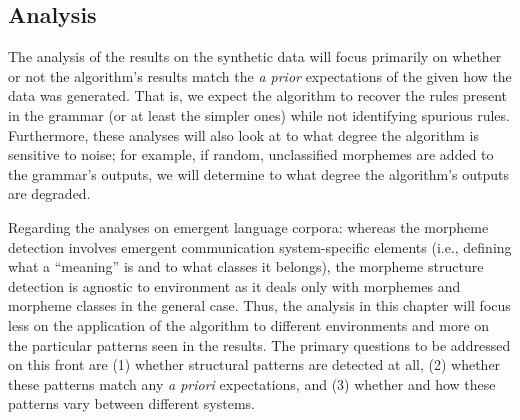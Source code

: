 \subsection{Analysis}

The analysis of the results on the synthetic data will focus primarily on whether or not the algorithm's results match the \emph{a prior} expectations of the given how the data was generated.
That is, we expect the algorithm to recover the rules present in the grammar (or at least the simpler ones) while not identifying spurious rules.
Furthermore, these analyses will also look at to what degree the algorithm is sensitive to noise; for example, if random, unclassified morphemes are added to the grammar's outputs, we will determine to what degree the algorithm's outputs are degraded.

Regarding the analyses on emergent language corpora:
  whereas the morpheme detection involves emergent communication system-specific elements (i.e., defining what a ``meaning'' is and to what classes it belongs), the morpheme structure detection is agnostic to environment as it deals only with morphemes and morpheme classes in the general case.
Thus, the analysis in this chapter will focus less on the application of the algorithm to different environments and more on the particular patterns seen in the results.
The primary questions to be addressed on this front are
  (1) whether structural patterns are detected at all,
  (2) whether these patterns match any \emph{a priori} expectations,
  and (3) whether and how these patterns vary between different systems.

